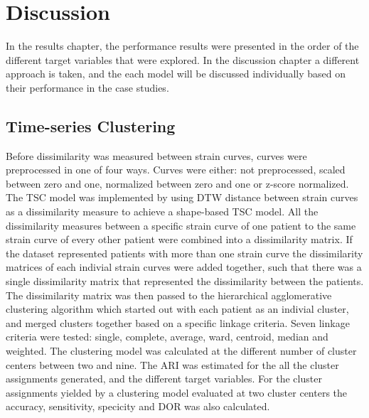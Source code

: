 \chapter{Discussion} \label{chap:discussion}

In the results chapter, the performance results were presented in the order of the different target variables that were explored. 
In the discussion chapter a different approach is taken, and the each model will be discussed individually based on their performance in the case studies.

\section{Time-series Clustering} \label{sec:disc_tsc}

Before dissimilarity was measured between strain curves, curves were preprocessed in one of four ways. 
Curves were either: not preprocessed, scaled between zero and one, normalized between zero and one or z-score normalized. The TSC model was implemented by using DTW distance between strain curves as a dissimilarity measure to achieve a shape-based TSC model. All the dissimilarity measures between a specific strain curve of one patient to the same strain curve of every other patient were combined into a dissimilarity matrix. If the dataset represented patients with more than one strain curve the dissimilarity matrices of each indivial strain curves were added together, such that there was a single dissimilarity matrix that represented the dissimilarity between the patients. The dissimilarity matrix was then passed to the hierarchical agglomerative clustering algorithm which started out with each patient as an indivial cluster, and merged clusters together based on a specific linkage criteria. Seven linkage criteria were tested: single, complete, average, ward, centroid, median and weighted. The clustering model was calculated at the different number of cluster centers between two and nine. The ARI was estimated for the all the cluster assignments generated, and the different target variables. For the cluster assignments yielded by a clustering model evaluated at two cluster centers the accuracy, sensitivity, specicity and DOR was also calculated. \bigskip

